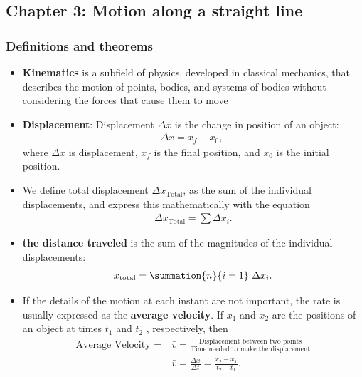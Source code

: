 \documentclass{report}
\begin{document}
    \pagebreak 
    \subsection{Chapter 3: Motion along a straight line}
    \bigbreak \noindent 
    \subsubsection{Definitions and theorems}
    \begin{itemize}
        \item \textbf{Kinematics} is a subfield of physics, developed in classical mechanics, that describes the motion of points, bodies, and systems of bodies without considering the forces that cause them to move
        \item \textbf{Displacement}: Displacement $\Delta x$ is the change in position of an object:
            \begin{align*}
                \Delta x = x_f - x_0,
            .\end{align*}
            where $\Delta x$ is displacement, $x_f$ is the final position, and $x_0$ is the initial position.
        \item We define total displacement $\Delta x_{\text{Total}}$, as the sum of the individual displacements, and express this mathematically with the equation
            \begin{align*}
                \Delta x_{\text{Total}} = \sum \Delta x_i
            .\end{align*}
        \item \textbf{the distance traveled} is the sum of the magnitudes of the individual displacements:
            \begin{align*}
                x_{\text{total}} = \summation{n}{i=1}\ \Delta x_{i}
            .\end{align*}
        \item If the details of the motion at each instant are not important, the rate is usually expressed as the \textbf{average velocity}. If  $x_{1}$ and  $x_{2} $ are the positions of an object at times  $t_{1} $ and  $t_{2}$ , respectively, then 
            \begin{align*}
                \text{Average Velocity } =\ &\bar{v} =  \frac{\text{Displacement between two points}}{\text{Time needed to make the displacement}} \\
                &\bar{v} = \frac{\Delta x}{\Delta t} = \frac{x_{2} - x_{1}}{t_{2} - t_{1}}
            .\end{align*}
        

\end{itemize}
\end{document}

